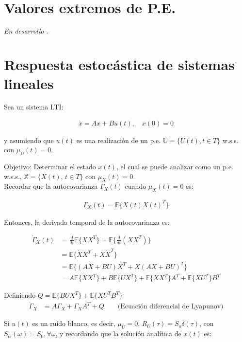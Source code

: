 \section{Valores extremos de P.E.}

\emph{En desarrollo} \parencite[Sec. 6.2]{wirsching2006randomvibrations}.

\section{Respuesta estocástica de sistemas lineales}

Sea un sistema LTI:

\begin{align*}
    {\dot{x}} ={A}{x} + {B}u(t), \quad {x}(0)={0}
\end{align*}

y asumiendo que $u(t)$ es una realización de un p.e. $\mathbb{U} = \{U(t), t \in T\}$ w.s.s. con $\mu_\mathbb{U}(t) = 0$. \\

\par \underline{Objetivo}: Determinar el estado ${x}(t)$, el cual se puede analizar como un p.e. w.s.s., $\mathbb{X} = \{X(t)$, $t \in T\}$ con $\mu_X(t)=0$\\

Recordar que la autocovarianza ${\Gamma}_X(t)$ cuando $\mu_X(t)=0$ es:

\begin{align*}
    \Gamma_X(t) = \mathbb{E}\{X(t)X(t)^T\}
\end{align*}

Entonces, la derivada temporal de la autocovarianza es:

\begin{align*}
    \dot{\Gamma}_X(t)&=\frac{d}{dt}\mathbb{E}\{XX^T\}=\mathbb{E}\{\frac{d}{dt}(XX^T)\}\\
    &= \mathbb{E}\{\dot{X}X^T+X\dot{X}^T\}\\
    &= \mathbb{E}\{(AX+BU)X^T+X(AX+BU)^T\}\\
    &= A\mathbb{E}\{XX^T\}+B\mathbb{E}\{UX^T\}+\mathbb{E}\{XX^T\}A^T+\mathbb{E}\{XU^T\}B^T
\end{align*}

Definiendo $Q=\mathbb{E}\{BUX^T\}+\mathbb{E}\{XU^T B^T\}$
\begin{align*}
    \dot{\Gamma}_X &= A\Gamma_X+\Gamma_XA^T+Q \qquad \text{(Ecuación diferencial de Lyapunov)}
\end{align*}

Si ${u}(t)$ es un ruido blanco, es decir, $\mu_U=0$, $R_U(\tau)= S_o\delta (\tau)$, con $S_U(\omega)=S_0, \forall \omega$, y recordando que la solución analítica de $x(t)$ es:

